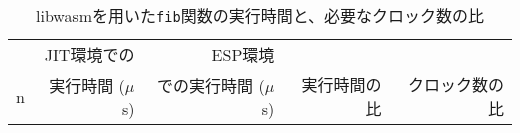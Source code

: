\begin{table}[htbp]
  \caption{libwasmを用いた{\tt fib}関数の実行時間と、必要なクロック数の比}
  \label{tab:fib_time}
  \begin{center}
    \begin{tabular}{rrrrr}
      \hline
      & JIT環境での & ESP環境 & & \\
      n & 実行時間 ($\mu$s) & での実行時間 ($\mu$s) & 実行時間の比 & クロック数の比 \\ \hline \hline

\end{tabular}
\end{center}
\end{table}
